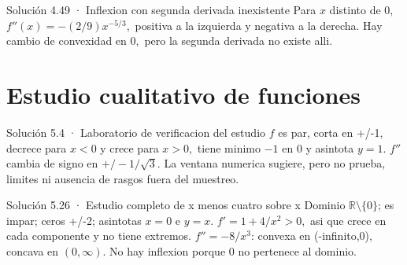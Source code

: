 \documentclass[10pt,a4paper,oneside,openany]{book}
\begin{document}
\begin{PSevenSolutionFixed}{Solución 4.49 · Inflexion con segunda derivada inexistente}
Para \(x\) distinto de \(0,\) \(f''(x)=-(2/9)x^{-5/3},\) positiva a la izquierda y negativa a la derecha. Hay cambio de convexidad en \(0,\) pero la segunda derivada no existe alli.
\end{PSevenSolutionFixed}
\chapter{Estudio cualitativo de funciones}
\begin{PSevenSolutionFixed}{Solución 5.4 · Laboratorio de verificacion del estudio}
\(f\) es par, corta en +/-1, decrece para \(x<0\) y crece para \(x>0,\) tiene minimo \(-1\) en \(0\) y asintota \(y=1\). \(f''\) cambia de signo en \(+/-1/\sqrt{3}\). La ventana numerica sugiere, pero no prueba, limites ni ausencia de rasgos fuera del muestreo.
\end{PSevenSolutionFixed}
\begin{PSevenSolutionFixed}{Solución 5.26 · Estudio completo de x menos cuatro sobre x}
Dominio \(\mathbb{R}\setminus \{0\}\); es impar; ceros +/-2; asintotas \(x=0\) e \(y=x\). \(f'=1+4/x^{2}>0,\) asi que crece en cada componente y no tiene extremos. \(f''=-8/x^{3}\): convexa en (-infinito,0), concava en \((0,\infty )\). No hay inflexion porque \(0\) no pertenece al dominio.
\end{PSevenSolutionFixed}
\end{document}
